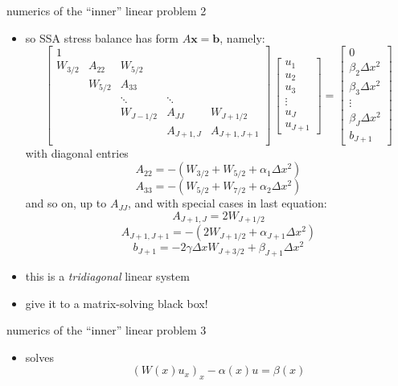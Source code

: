 \begin{frame}{numerics of the ``inner'' linear problem 2}

\begin{itemize}
\small
\item so SSA stress balance has form  \quad $A \mathbf{x} = \mathbf{b}$, \quad namely:
\scriptsize
$$
\begin{bmatrix}
1 &  &  &  &  \\
W_{3/2} & A_{22} & W_{5/2} &  &  \\
 & W_{5/2} & A_{33} &  &  \\
 &  & \ddots & \ddots &  \\
 &  & W_{J-1/2} & A_{JJ} & W_{J+1/2} \\
 &  &  & A_{J+1,J} & A_{J+1,J+1} \\
\end{bmatrix}\,
\begin{bmatrix}
u_1 \\ u_2 \\ u_3 \\ \vdots \\ u_J \\ u_{J+1}
\end{bmatrix}
=
\begin{bmatrix}
0 \\ \beta_2 \Delta x^2 \\ \beta_3 \Delta x^2 \\ \vdots \\ \beta_J \Delta x^2 \\ b_{J+1}
\end{bmatrix}
$$
with diagonal entries
$$A_{22} = -(W_{3/2}+W_{5/2}+\alpha_1 \Delta x^2)$$
$$A_{33} = -(W_{5/2}+W_{7/2}+\alpha_2 \Delta x^2)$$
and so on, up to $A_{JJ}$, and with special cases in last equation:
$$A_{J+1,J} = 2 W_{J+1/2}$$
$$A_{J+1,J+1} = -(2 W_{J+1/2}+\alpha_{J+1}\Delta x^2)$$
$$b_{J+1} = -2 \gamma \Delta x W_{J+3/2} + \beta_{J+1} \Delta x^2$$

\small
\smallskip
\item this is a \emph{tridiagonal} linear system
\item give it to a matrix-solving black box!
\end{itemize}
\end{frame}


\begin{frame}{numerics of the ``inner'' linear problem 3}


\vspace{-5mm}
\begin{itemize}
\item solves
  $$\left(W(x)u_x\right)_x - \alpha(x) u = \beta(x)$$
\end{itemize}
\end{frame}



